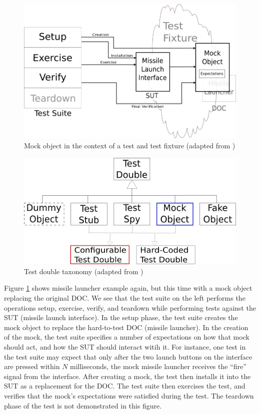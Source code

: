 \documentclass[proposal]{softeng}
\begin{document}
\begin{figure}
  \centering
  \includegraphics[scale=.45]{img/missile_launch3.png}
  \caption{Mock object in the context of a test and test fixture
    (adapted from \cite{meszaros:xunit})}
  \label{fig:missile_mock}
\end{figure}

\begin{figure}
  \centering
  \includegraphics[scale=.7]{img/test_double_taxonomy.png}
  \caption{Test double taxonomy (adapted from \cite{meszaros:xunit})}
  \label{fig:taxonomy}
\end{figure}

Figure \ref{fig:missile_mock} shows missile launcher example again, but
this time with a mock object replacing the original DOC. We see that
the test suite on the left performs the operations setup, exercise,
verify, and teardown while performing tests against the SUT (missile
launch interface). In the setup phase, the test suite creates the mock
object to replace the hard-to-test DOC (missile launcher). In the
creation of the mock, the test suite specifies a number of
expectations on how that mock should act, and how the SUT should
interact witih it. For instance, one test in the test suite may expect
that only after the two launch buttons on the interface are pressed
within $N$ milliseconds, the mock missile launcher receives the
``fire'' signal from the interface. After creating a mock, the test
then installs it into the SUT as a replacement for the DOC. The test
suite then exercises the test, and verifies that the mock's
expectations were satisfied during the test. The teardown phase of the
test is not demonstrated in this figure.
\end{document}
